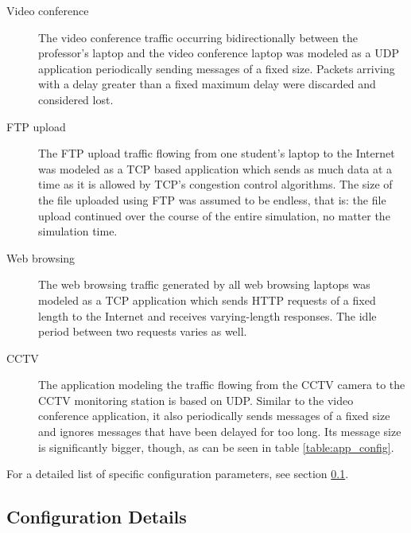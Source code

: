 \documentclass[
10pt, %
a4paper, %
oneside, %
headinclude,footinclude, %
BCOR5mm, %
]{scrartcl}
\begin{document}
\begin{description}
\item[Video conference] The video conference traffic occurring bidirectionally between the professor's laptop and the video conference laptop was modeled as a UDP application periodically sending messages of a fixed size. Packets arriving with a delay greater than a fixed maximum delay were discarded and considered lost.
\item[FTP upload] The FTP upload traffic flowing from one student's laptop to the Internet was modeled as a TCP based application which sends as much data at a time as it is allowed by TCP's congestion control algorithms.
The size of the file uploaded using FTP was assumed to be endless, that is: the file upload continued over the course of the entire simulation, no matter the simulation time.
\item[Web browsing] The web browsing traffic generated by all web browsing laptops was modeled as a TCP application which sends HTTP requests of a fixed length to the Internet and receives varying-length responses. The idle period between two requests varies as well.
\item[CCTV] The application modeling the traffic flowing from the CCTV camera to the CCTV monitoring station is based on UDP. Similar to the video conference application, it also periodically sends messages of a fixed size and ignores messages that have been delayed for too long. Its message size is significantly bigger, though, as can be seen in table \ref{table:app_config}.
\end{description}

For a detailed list of specific configuration parameters, see section \ref{sec:conf_details}.

\subsection{Configuration Details}
\label{sec:conf_details}
\end{document}
